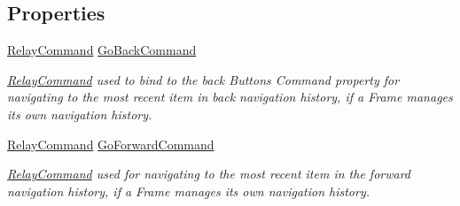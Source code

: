 \subsection*{Properties}
\begin{DoxyCompactItemize}
\item 
\hyperlink{class__1aarsproeve_1_1_common_1_1_relay_command}{Relay\+Command} \hyperlink{class__1aarsproeve_1_1_common_1_1_navigation_helper_a4f5f9df95a5c10434b08d04da50a2467}{Go\+Back\+Command}
\begin{DoxyCompactList}\small\item\em \hyperlink{class__1aarsproeve_1_1_common_1_1_relay_command}{Relay\+Command} used to bind to the back Button\textquotesingle{}s Command property for navigating to the most recent item in back navigation history, if a Frame manages its own navigation history. \end{DoxyCompactList}\item 
\hyperlink{class__1aarsproeve_1_1_common_1_1_relay_command}{Relay\+Command} \hyperlink{class__1aarsproeve_1_1_common_1_1_navigation_helper_a9bb68ebbefcf2daaeaf8f18775eb8a80}{Go\+Forward\+Command}
\begin{DoxyCompactList}\small\item\em \hyperlink{class__1aarsproeve_1_1_common_1_1_relay_command}{Relay\+Command} used for navigating to the most recent item in the forward navigation history, if a Frame manages its own navigation history. \end{DoxyCompactList}\end{DoxyCompactItemize}
